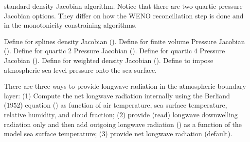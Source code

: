 \begin{klist}
standard density Jacobian algorithm. Notice that there are two
quartic pressure Jacobian options. They differ on how the WENO
reconciliation
step is done and in the monotonicity constraining algorithms.
  \begin{klist}
      Define for splines density Jacobian
  (\cite{SS2003}).
      Define for finite volume Pressure Jacobian
  (\cite{Lin97}).
      Define for quartic 2 Pressure Jacobian
  (\cite{SS2003}).
      Define for quartic 4 Pressure Jacobian
  (\cite{SS2003}).
      Define for weighted density Jacobian
  (\cite{Song98}).
      Define to impose atmospheric sea-level pressure
  onto the sea surface.
  \end{klist}
   There are three ways to provide longwave radiation in the atmospheric
 boundary layer: (1) Compute the net longwave radiation internally
 using the Berliand (1952) equation () as function of
 air temperature, sea surface temperature, relative humidity, and cloud
 fraction; (2) provide (read) longwave downwelling radiation only  and
 then add outgoing longwave radiation () as a function
 of the model sea surface temperature; (3) provide net longwave radiation
 (default).


\end{klist}
